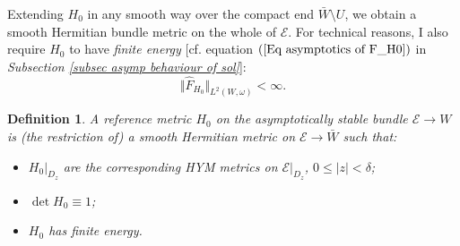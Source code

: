 \documentclass{article}
\newtheorem{definition}[theorem]{Definition}
\begin{document}
Extending $H_0$ in any smooth way over the compact end $\bar{W} \setminus U$, we obtain
a
smooth Hermitian bundle metric on the whole of $\mathcal{E}$. For technical reasons,
I also require $H_{0}$ to have \emph{finite energy} [cf. equation $(\ref{Eq asymptotics of F_H0})$ in \emph{Subsection \ref{subsec asymp behaviour of sol}}]:%
\begin{equation*}
        \Vert \hat{F}_{H_{0}}\Vert _{L^{2}\left( W,\omega\right) }<\infty.
\end{equation*}

\begin{definition}      \label{def reference metric H0}
A \emph{reference metric} $H_{0}$ on the asymptotically stable bundle 
$\mathcal{E}\rightarrow W$ is (the restriction of) a smooth Hermitian metric on $\mathcal{E}\rightarrow \bar{W}$ such that:%
\begin{itemize}         
        \item 
        $\left. H_{0}\right\vert _{D_{z}}$ are the corresponding HYM metrics on $\left. \mathcal{E}\right\vert _{D_{z}}$, $0\leq
\left\vert z\right\vert <\delta $;
        \item
        $\det H_0\equiv1$;
        \item 
        $H_{0}$ has finite energy.
\end{itemize}
\end{definition}
\end{document}
